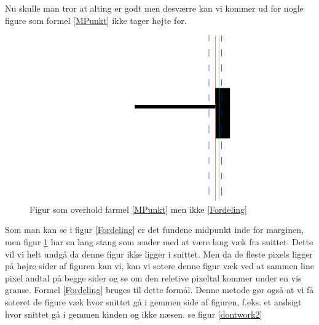 Nu skulle man tror at alting er godt men desværre kan vi kommer ud for
nogle figure som formel \ref{MPunkt} ikke tager højte for.

\begin{figure}[h]
	\begin{center}
		\includegraphics[scale=0.76,angle=0]{afsnit/vores_implementation/billeder/udvidet_loesning/dontWork.png}
	\end{center}
	\caption[]{Figur som overhold farmel \ref{MPunkt} men ikke \ref{Fordeling}}
	\label{dontwork}
\end{figure}

Som man kan se i figur \ref{Fordeling} er det fundene midpunkt inde for
marginen, men figur \ref{dontwork} har en lang stang som ænder med at
være lang væk fra snittet. Dette vil vi helt undgå da denne figur ikke
ligger i snittet. Men da de fleste pixels ligger på højre sider af
figuren kan vi, kan vi sotere denne figur væk ved at sammen line pixel
andtal på begge sider og se om den reletive pixeltal kommer under en vis
granse. Formel \ref{Fordeling} bruges til dette formål. Denne metode gør
også at vi få soteret de figure væk hvor snittet gå i gemmen side af
figuren, f.eks. et andsigt hvor snittet gå i gemmen kinden og ikke
næsen. se figur \ref{dontwork2}


